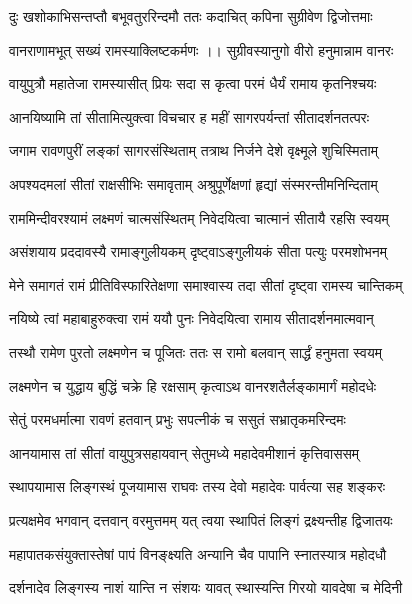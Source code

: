 \twolineshloka
{दुः खशोकाभिसन्तप्तौ बभूवतुररिन्दमौ}
{ततः कदाचित् कपिना सुग्रीवेण द्विजोत्तमाः} %

\twolineshloka
{वानराणामभूत् सख्यं रामस्याक्लिष्टकर्मणः ।।}
{सुग्रीवस्यानुगो वीरो हनुमान्नाम वानरः} %

\twolineshloka
{वायुपुत्रौ महातेजा रामस्यासीत् प्रियः सदा}
{स कृत्वा परमं धैर्यं रामाय कृतनिश्चयः} %

\twolineshloka
{आनयिष्यामि तां सीतामित्युक्त्वा विचचार ह}
{महीं सागरपर्यन्तां सीतादर्शनतत्परः} %

\twolineshloka
{जगाम रावणपुरीं लङ्कां सागरसंस्थिताम्}
{तत्राथ निर्जने देशे वृक्ष्मूले शुचिस्मिताम्} %

\twolineshloka
{अपश्यदमलां सीतां राक्षसीभिः समावृताम्}
{अश्रुपूर्णेक्षणां हृद्यां संस्मरन्तीमनिन्दिताम्} %

\twolineshloka
{राममिन्दीवरश्यामं लक्ष्मणं चात्मसंस्थितम्}
{निवेदयित्वा चात्मानं सीतायै रहसि स्वयम्} %

\twolineshloka
{असंशयाय प्रददावस्यै रामाङ्‌गुलीयकम्}
{दृष्ट्वाऽङ्‌गुलीयकं सीता पत्युः परमशोभनम्} %

\twolineshloka
{मेने समागतं रामं प्रीतिविस्फारितेक्षणा}
{समाश्वास्य तदा सीतां दृष्ट्वा रामस्य चान्तिकम्} %

\twolineshloka
{नयिष्ये त्वां महाबाहुरुक्त्वा रामं ययौ पुनः}
{निवेदयित्वा रामाय सीतादर्शनमात्मवान्} %

\twolineshloka
{तस्थौ रामेण पुरतो लक्ष्मणेन च पूजितः}
{ततः स रामो बलवान् सार्द्धं हनुमता स्वयम्} %

\twolineshloka
{लक्ष्मणेन च युद्धाय बुद्धिं चक्रे हि रक्षसाम्}
{कृत्वाऽथ वानरशतैर्लङ्कामार्गं महोदधेः} %

\twolineshloka
{सेतुं परमधर्मात्मा रावणं हतवान् प्रभुः}
{सपत्नीकं च ससुतं सभ्रातृकमरिन्दमः} %

\twolineshloka
{आनयामास तां सीतां वायुपुत्रसहायवान्}
{सेतुमध्ये महादेवमीशानं कृत्तिवाससम्} %

\twolineshloka
{स्थापयामास लिङ्गस्थं पूजयामास राघवः}
{तस्य देवो महादेवः पार्वत्या सह शङ्करः} %

\twolineshloka
{प्रत्यक्षमेव भगवान् दत्तवान् वरमुत्तमम्}
{यत् त्वया स्थापितं लिङ्गं द्रक्ष्यन्तीह द्विजातयः} %

\twolineshloka
{महापातकसंयुक्तास्तेषां पापं विनङ्क्ष्यति}
{अन्यानि चैव पापानि स्नातस्यात्र महोदधौ} %

\twolineshloka
{दर्शनादेव लिङ्गस्य नाशं यान्ति न संशयः}
{यावत् स्थास्यन्ति गिरयो यावदेषा च मेदिनी} %

